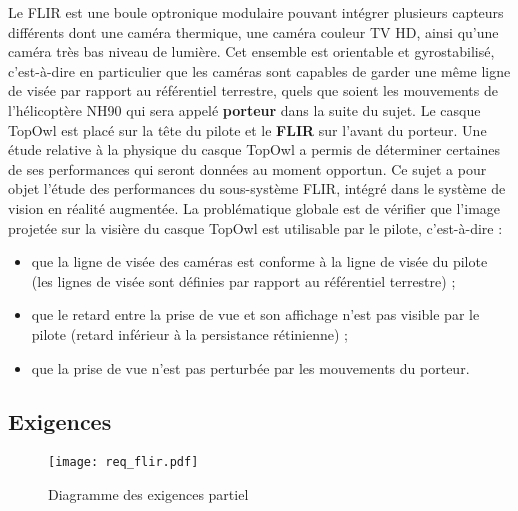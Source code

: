 Le FLIR est une boule optronique modulaire pouvant intégrer plusieurs capteurs différents dont une caméra
thermique, une caméra couleur TV HD, ainsi qu'une caméra très bas niveau de lumière. Cet ensemble est
orientable et gyrostabilisé, c'est-à-dire en particulier que les caméras sont capables de garder une même ligne
de visée par rapport au référentiel terrestre, quels que soient les mouvements de l'hélicoptère NH90 qui sera
appelé \textbf{porteur} dans la suite du sujet. Le casque TopOwl est placé sur la tête du pilote et le \textbf{FLIR} sur l'avant
du porteur.
Une étude relative à la physique du casque TopOwl a permis de déterminer certaines de ses performances qui
seront données au moment opportun. Ce sujet a pour objet l'étude des performances du sous-système FLIR,
intégré dans le système de vision en réalité augmentée. La problématique globale est de vérifier que l'image
projetée sur la visière du casque TopOwl est utilisable par le pilote, c'est-à-dire :
\begin{itemize}
\item  que la ligne de visée des caméras est conforme à la ligne de visée du pilote (les lignes de visée sont définies
par rapport au référentiel terrestre) ;
\item que le retard entre la prise de vue et son affichage n'est pas visible par le pilote (retard inférieur à la
persistance rétinienne) ;
\item que la prise de vue n'est pas perturbée par les mouvements du porteur.
\end{itemize}


\subsection*{Exigences}

\begin{figure}[!htb]
\begin{center}
\texttt{[image: req\_flir.pdf]}
\caption{Diagramme des exigences partiel \label{req_flir}}
\end{center}
\end{figure}


